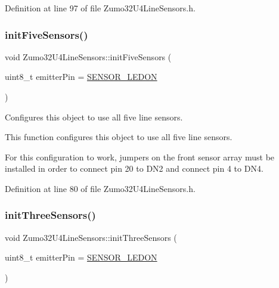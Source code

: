 Definition at line 97 of file Zumo32\+U4\+Line\+Sensors.\+h.

\mbox{\label{class_zumo32_u4_line_sensors_a3873997ed35fbc1c6c57411f6cee1f2d}} 
\subsubsection{\texorpdfstring{init\+Five\+Sensors()}{initFiveSensors()}}
{\footnotesize\ttfamily void Zumo32\+U4\+Line\+Sensors\+::init\+Five\+Sensors (\begin{DoxyParamCaption}\item[{uint8\+\_\+t}]{emitter\+Pin = {\ttfamily \hyperlink{_zumo32_u4_line_sensors_8h_a661904c7fa6e0b2cb9645e2ef272cfcd}{S\+E\+N\+S\+O\+R\+\_\+\+L\+E\+D\+ON}} }\end{DoxyParamCaption})\hspace{0.3cm}{\ttfamily [inline]}}



Configures this object to use all five line sensors. 

This function configures this object to use all five line sensors.

For this configuration to work, jumpers on the front sensor array must be installed in order to connect pin 20 to D\+N2 and connect pin 4 to D\+N4. 

Definition at line 80 of file Zumo32\+U4\+Line\+Sensors.\+h.

\mbox{\label{class_zumo32_u4_line_sensors_a880737a0df457e9acf3277b2342e4087}} 
\subsubsection{\texorpdfstring{init\+Three\+Sensors()}{initThreeSensors()}}
{\footnotesize\ttfamily void Zumo32\+U4\+Line\+Sensors\+::init\+Three\+Sensors (\begin{DoxyParamCaption}\item[{uint8\+\_\+t}]{emitter\+Pin = {\ttfamily \hyperlink{_zumo32_u4_line_sensors_8h_a661904c7fa6e0b2cb9645e2ef272cfcd}{S\+E\+N\+S\+O\+R\+\_\+\+L\+E\+D\+ON}} }\end{DoxyParamCaption})\hspace{0.3cm}{\ttfamily [inline]}}



